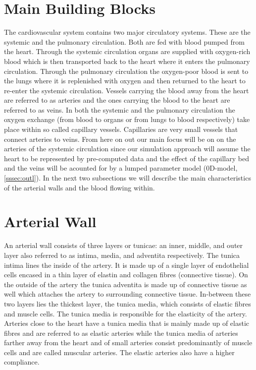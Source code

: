 \documentclass[a4paper, oneside]{discothesis}
\begin{document}
\section{Main Building Blocks} \label{mbb}
The cardiovascular system contains two major circulatory systems.
These are the systemic and the pulmonary circulation. 
Both are fed with blood pumped from the heart.
Through the systemic circulation organs are supplied with oxygen-rich blood which is then transported back to the heart where it enters the pulmonary circulation.
Through the pulmonary circulation the oxygen-poor blood is sent to the lungs where it is replenished with oxygen and then returned to the heart to re-enter the systemic circulation.
Vessels carrying the blood away from the heart are referred to as arteries and the ones carrying the blood to the heart are referred to as veins.
In both the systemic and the pulmonary circulation the oxygen exchange (from blood to organs or from lungs to blood respectively) take place within so called capillary vessels.
Capillaries are very small vessels that connect arteries to veins. \cite{köppl2023dimension}
From here on out our main focus will be on on the arteries of the systemic circulation since our simulation approach will assume the heart to be represented by pre-computed data and the effect of the capillary bed and the veins will be acounted for by a lumped parameter model (0D-model, \autoref{sssec:outl}).
In the next two subsections we will describe the main characteristics of the arterial walls and the blood flowing within.

\section{Arterial Wall} \label{aw}
An arterial wall consists of three layers or tunicae: an inner, middle, and outer layer also referred to as intima, media, and adventita respectively.
The tunica intima lines the inside of the artery. It is made up of a single layer of endothelial cells encased in a thin layer of elastin and collagen fibres (connective tissue). 
On the outside of the artery the tunica adventita is made up of connective tissue as well which attaches the artery to surrounding connective tissue.
In-between these two layers lies the thickest layer, the tunica media, which consists of elastic fibres and muscle cells. 
The tunica media is responsible for the elasticity of the artery.
Arteries close to the heart have a tunica media that is mainly made up of elastic fibres and are referred to as elastic arteries while the tunica media of arteries farther away from the heart and of small arteries consist predominantly of muscle cells and are called muscular arteries.
The elastic arteries also have a higher compliance.
 
\end{document}

